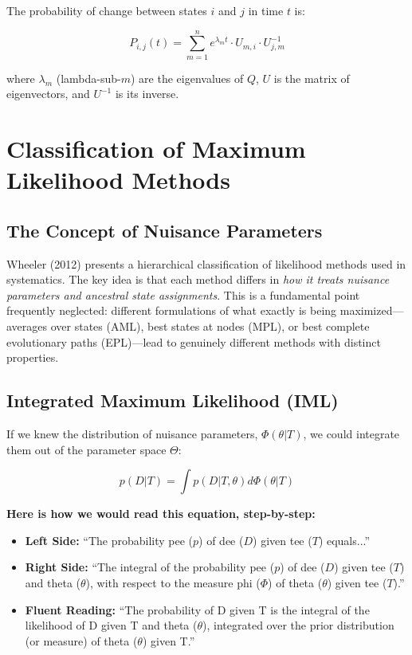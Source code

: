 The probability of change between states $i$ and $j$ in time $t$ is:

$$P_{i,j}(t) = \sum_{m=1}^{n} e^{\lambda_m t} \cdot U_{m,i} \cdot U^{-1}_{j,m}$$

where $\lambda_m$ (lambda-sub-$m$) are the eigenvalues of $Q$, $U$ is the matrix of eigenvectors, and $U^{-1}$ is its inverse.

\section{Classification of Maximum Likelihood Methods}

\subsection{The Concept of Nuisance Parameters}

Wheeler (2012) presents a hierarchical classification of likelihood methods used in systematics. The key idea is that each method differs in \textit{how it treats nuisance parameters and ancestral state assignments}. This is a fundamental point frequently neglected: different formulations of what exactly is being maximized---averages over states (AML), best states at nodes (MPL), or best complete evolutionary paths (EPL)---lead to genuinely different methods with distinct properties.

\subsection{Integrated Maximum Likelihood (IML)}

If we knew the distribution of nuisance parameters, $\Phi(\theta|T)$, we could integrate them out of the parameter space $\Theta$:

$$p(D|T) = \int p(D|T, \theta) d\Phi(\theta|T)$$

\textbf{Here is how we would read this equation, step-by-step:}

\begin{itemize}
    \item \textbf{Left Side:} ``The probability pee ($p$) of dee ($D$) given tee ($T$) equals...''
    \item \textbf{Right Side:} ``The integral of the probability pee ($p$) of dee ($D$) given tee ($T$) and theta ($\theta$), with respect to the measure phi ($\Phi$) of theta ($\theta$) given tee ($T$).''
    \item \textbf{Fluent Reading:} ``The probability of D given T is the integral of the likelihood of D given T and theta ($\theta$), integrated over the prior distribution (or measure) of theta ($\theta$) given T.''
\end{itemize}

